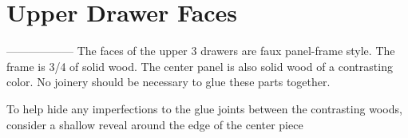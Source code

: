 \section{Upper Drawer Faces}
------------------
The faces of the upper 3 drawers are faux panel-frame style. The frame is 3/4 of solid wood. The center panel is also solid wood of a contrasting color. No joinery should be necessary to glue these parts together.

To help hide any imperfections to the glue joints between the contrasting woods, consider a shallow reveal around the edge of the center piece
